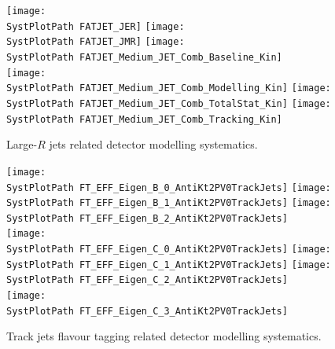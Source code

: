 \begin{figure}[!h]
\begin{center}
\texttt{[image: \\SystPlotPath FATJET\_JER]}                                                
\texttt{[image: \\SystPlotPath FATJET\_JMR]}                                                 
\texttt{[image: \\SystPlotPath FATJET\_Medium\_JET\_Comb\_Baseline\_Kin]}\\
\texttt{[image: \\SystPlotPath FATJET\_Medium\_JET\_Comb\_Modelling\_Kin]}
\texttt{[image: \\SystPlotPath FATJET\_Medium\_JET\_Comb\_TotalStat\_Kin]}
\texttt{[image: \\SystPlotPath FATJET\_Medium\_JET\_Comb\_Tracking\_Kin]}
\caption{Large-$R$ jets related detector modelling systematics.}
\label{fig:systplots_larger}
\end{center}
\end{figure}

\begin{figure}[!h]
\begin{center}
\texttt{[image: \\SystPlotPath FT\_EFF\_Eigen\_B\_0\_AntiKt2PV0TrackJets]}    
\texttt{[image: \\SystPlotPath FT\_EFF\_Eigen\_B\_1\_AntiKt2PV0TrackJets]}    
\texttt{[image: \\SystPlotPath FT\_EFF\_Eigen\_B\_2\_AntiKt2PV0TrackJets]}    \\
\texttt{[image: \\SystPlotPath FT\_EFF\_Eigen\_C\_0\_AntiKt2PV0TrackJets]}  
\texttt{[image: \\SystPlotPath FT\_EFF\_Eigen\_C\_1\_AntiKt2PV0TrackJets]}  
\texttt{[image: \\SystPlotPath FT\_EFF\_Eigen\_C\_2\_AntiKt2PV0TrackJets]}     \\
\texttt{[image: \\SystPlotPath FT\_EFF\_Eigen\_C\_3\_AntiKt2PV0TrackJets]}   
\caption{Track jets flavour tagging related detector modelling systematics.}
\label{fig:systplots_btag_trkjet_1}
\end{center}
\end{figure}

